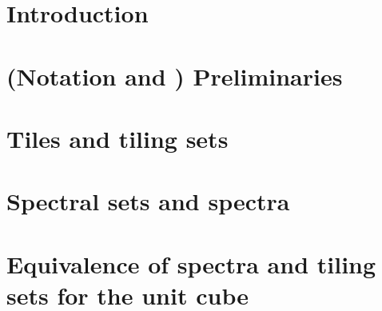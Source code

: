 \documentclass[british, oneside]{ntnuthesis}
\begin{document}
    



    \chapter{Introduction}
        

    \chapter{(Notation and ) Preliminaries}
        
    
    \chapter{Tiles and tiling sets}\label{chap:tiling}  %
        

    \chapter{Spectral sets and spectra}  %
        
    
    \chapter{Equivalence of spectra and tiling sets for the unit cube}\label{chap:equivalence}
        


    \printbibliography
\end{document}
